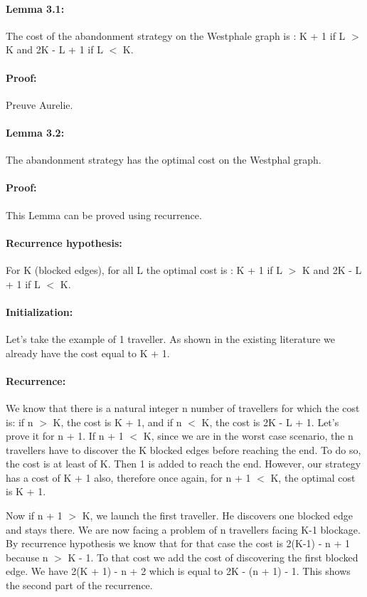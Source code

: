 \documentclass[a4paper, 10pt]{article}
\begin{document}
\paragraph{Lemma 3.1:} The cost of the abandonment strategy on the Westphale graph is : K + 1 if L $>$ K and 2K - L + 1 if L $<$ K.

\paragraph{Proof:} Preuve Aurelie.

\paragraph{Lemma 3.2:} The abandonment strategy has the optimal cost on the Westphal graph.

\paragraph{Proof:} This Lemma can be proved using recurrence.  

\paragraph{Recurrence hypothesis:} For K (blocked edges), for all L the optimal cost is : K + 1 if L $>$ K and 2K - L + 1 if L $<$ K.

\paragraph{Initialization:} Let's take the example of 1 traveller. As shown in the existing literature we already have the cost equal to K + 1.

\paragraph{Recurrence:} We know that there is a natural integer n number of travellers for which the cost is: if n $>$ K, the cost is K + 1, and if n $<$ K, the cost is 2K - L + 1. Let's prove it for n + 1. 
If n + 1 $<$ K, since we are in the worst case scenario, the n travellers have to discover the K blocked edges before reaching the end. To do so, the cost is at least of K. Then 1 is added to reach the end. However, our strategy has a cost of K + 1 also, therefore once again, for n + 1 $<$ K, the optimal cost is K + 1. 

Now if n + 1 $>$ K, we launch the first traveller. He discovers one blocked edge and stays there. We are now facing a problem of n travellers facing K-1 blockage. By recurrence hypothesis we know that for that case the cost is 2(K-1) - n + 1 because n $>$ K - 1. To that cost we add the cost of discovering the first blocked edge. We have 2(K + 1) - n + 2 which is equal to 2K - (n + 1) - 1. This shows the second part of the recurrence.
\end{document}
